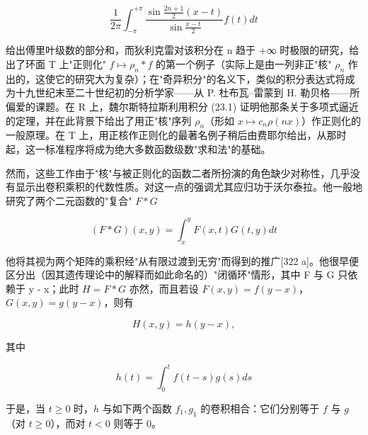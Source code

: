 \[
\frac {1}{2 \pi} \int_ {- \pi} ^ {+ \pi} \frac {\sin \frac {2 n + 1}{2} (x - t)}{\sin \frac {x - t}{2}} f (t) d t\tag{23.2}
\]

给出傅里叶级数的部分和，而狄利克雷对该积分在 n 趋于 +∞ 时极限的研究，给出了环面 T 上"正则化" \(f \mapsto \rho_{n} * f\) 的第一个例子（实际上是由一列非正"核" \(\rho_{n}\) 作出的，这使它的研究大为复杂）；在"奇异积分"的名义下，类似的积分表达式将成为十九世纪末至二十世纪初的分析学家——从 P. 杜布瓦–雷蒙到 H. 勒贝格——所偏爱的课题。在 R 上，魏尔斯特拉斯利用积分 (23.1) 证明他那条关于多项式逼近的定理，并在此背景下给出了用正"核"序列 \(\rho_{n}\)（形如 \(x \mapsto c_{n} \rho(nx)\)）作正则化的一般原理。在 T 上，用正核作正则化的最著名例子稍后由费耶尔给出，从那时起，这一标准程序将成为绝大多数函数级数"求和法"的基础。

然而，这些工作由于"核"与被正则化的函数二者所扮演的角色缺少对称性，几乎没有显示出卷积乘积的代数性质。对这一点的强调尤其应归功于沃尔泰拉。他一般地研究了两个二元函数的"复合" \(F * G\)

\[
(F * G) (x, y) = \int_ {x} ^ {y} F (x, t) G (t, y) d t
\]

他将其视为两个矩阵的乘积经"从有限过渡到无穷"而得到的推广{[}322 a{]}。他很早便区分出（因其遗传理论中的解释而如此命名的）"闭循环"情形，其中 F 与 G 只依赖于 y - x；此时 \(H = F * G\) 亦然，而且若设 \(F(x, y) = f(y - x)\)，\(G(x, y) = g(y - x)\)，则有

\[
H (x, y) = h (y - x),
\]

其中

\[
h (t) = \int_ {0} ^ {t} f (t - s) g (s) d s
\]

于是，当 \(t \geq 0\) 时，\(h\) 与如下两个函数 \(f_1, g_1\) 的卷积相合：它们分别等于 \(f\) 与 \(g\)（对 \(t \geq 0\)），而对 \(t < 0\) 则等于 0。

